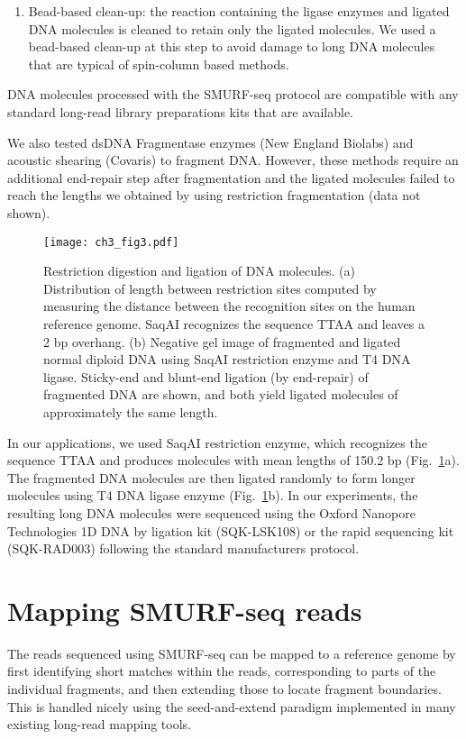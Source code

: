 \begin{enumerate}
\item Bead-based clean-up: the reaction containing the ligase enzymes and
  ligated DNA molecules is cleaned to retain only the ligated molecules. We
  used a bead-based clean-up at this step to avoid damage to long DNA
  molecules that are typical of spin-column based methods.
\end{enumerate}
DNA molecules processed with the SMURF-seq protocol are compatible with
any standard long-read library preparations kits that are available.

We also tested dsDNA Fragmentase enzymes (New England Biolabs) and
acoustic shearing (Covaris) to fragment DNA. However, these methods
require an additional end-repair step after fragmentation and the
ligated molecules failed to reach the lengths we obtained by using
restriction fragmentation (data not shown).

\begin{figure}[t!]
\centering
\texttt{[image: ch3\_fig3.pdf]}
\caption{Restriction digestion and ligation of DNA molecules.
  (a) Distribution of length between restriction sites computed
  by measuring the distance between the recognition sites on the human
  reference genome. SaqAI recognizes the sequence TTAA and leaves a 2 bp
  overhang.
  (b) Negative gel image of fragmented and ligated normal diploid DNA
  using SaqAI restriction enzyme and T4 DNA ligase.  Sticky-end and
  blunt-end ligation (by end-repair) of fragmented DNA are shown, and
  both yield ligated molecules of approximately the same length.}
\label{re_frag}
\end{figure}

In our applications, we used SaqAI restriction enzyme, which recognizes
the sequence TTAA and produces molecules with mean lengths of 150.2 bp
(Fig.~\ref{re_frag}a).
The fragmented DNA molecules are then ligated randomly to form longer
molecules using T4 DNA ligase enzyme (Fig.~\ref{re_frag}b).
In our experiments, the resulting long DNA molecules were sequenced
using the Oxford Nanopore Technologies 1D DNA by ligation kit
(SQK-LSK108) or the rapid sequencing kit (SQK-RAD003) following the
standard manufacturers protocol.


\section{Mapping SMURF-seq reads}
The reads sequenced using SMURF-seq can be mapped to a reference genome
by first identifying short matches within the reads, corresponding to
parts of the individual fragments, and then extending those to locate
fragment boundaries. This is handled nicely using the seed-and-extend
paradigm implemented in many existing long-read mapping tools.


